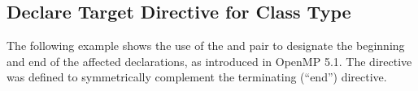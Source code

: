 
\subsection{Declare Target Directive for Class Type}
\label{subsec:declare_target_class}


The following example shows the use of the 
and  pair to designate the beginning and
end of the affected declarations, as introduced in OpenMP 5.1.
The  directive was defined
to symmetrically complement the terminating (``end'') directive.

